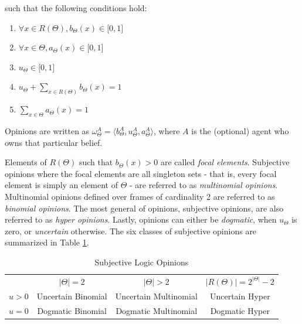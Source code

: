 \documentclass[thesis.tex]{subfiles}
\begin{document}
such that the following conditions hold:

\begin{enumerate}
  \item $\forall x \in R\left(\Theta\right), b_\Theta\left(x\right) \in \lbrack 0, 1\rbrack$
  \item $\forall x \in \Theta, a_\Theta\left(x\right) \in \lbrack 0, 1\rbrack$
  \item $u_\Theta \in \lbrack 0, 1\rbrack$
  \item $u_\Theta + \sum_{x \in R\left(\Theta\right)} b_\Theta\left(x\right) = 1$
  \item $\sum_{x \in \Theta} a_\Theta\left(x\right) = 1$
\end{enumerate}

Opinions are written as $\omega^A_\Theta = \langle b^A_\Theta, u^A_\Theta, a^A_\Theta \rangle$, where
$A$ is the (optional) agent who owns that particular belief.

Elements of $R\left(\Theta\right)$ such that $b_\Theta\left(x\right) > 0$ are called \emph{focal elements}.
Subjective opinions where the focal elements are all singleton sets - that is, every focal element is
simply an element of $\Theta$ - are referred to as \emph{multinomial opinions}. Multinomial opinions
defined over frames of cardinality 2 are referred to as \emph{binomial opinions}. The most general of
opinions, subjective opinions, are also referred to as \emph{hyper opinions}. Lastly, opinions can either
be \emph{dogmatic}, when $u_\Theta$ is zero, or \emph{uncertain} otherwise. The six classes of subjective
opinions are summarized in Table \ref{tbl:sl-opinions}.

\begin{table}
  \begin{center}
    \begin{tabular}{ r|c|c|c| }
      \multicolumn{1}{r}{}
      &  \multicolumn{1}{c}{$|\Theta| = 2$}
      &  \multicolumn{1}{c}{$|\Theta| > 2$}
      &  \multicolumn{1}{c}{$|R(\Theta)| = 2^{|\Theta|} - 2$} \\
      \cline{2-4}
      $u > 0$ & Uncertain Binomial & Uncertain Multinomial & Uncertain Hyper \\
      \cline{2-4}
      $u = 0$ & Dogmatic Binomial & Dogmatic Multinomial & Dogmatic Hyper \\
      \cline{2-4}
    \end{tabular}
  \end{center}

  \caption{Subjective Logic Opinions}
  \label{tbl:sl-opinions}
\end{table}
\end{document}
